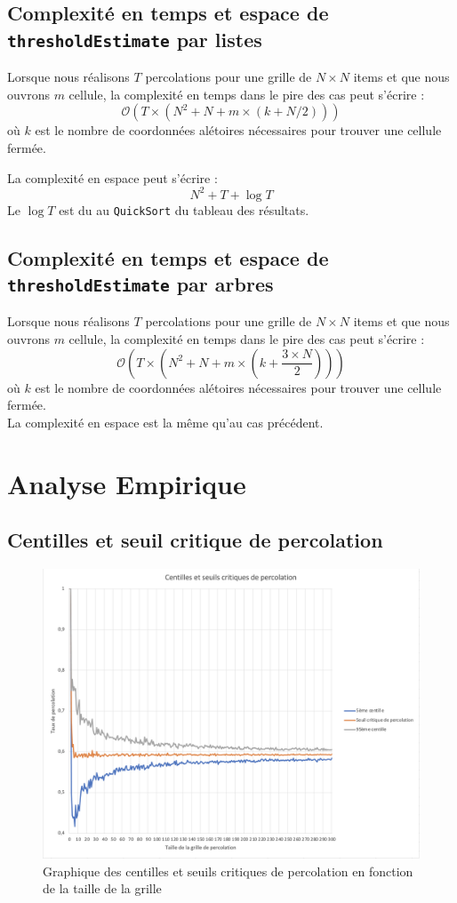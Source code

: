 \documentclass[12pt]{article}
\begin{document}
\subsection{Complexité en temps et espace de \texttt{thresholdEstimate} par listes}
Lorsque nous réalisons $T$ percolations pour une grille de $N \times N$ items et que nous ouvrons $m$ cellule, la complexité en temps dans le pire des cas peut s'écrire : \[\mathcal{O}(T\times(N^2 + N + m \times (k+N/2)))\] 
où $k$ est le nombre de coordonnées alétoires nécessaires pour trouver une cellule fermée.

La complexité en espace peut s'écrire : \[ N^2 + T + \log{T}\]
Le $\log{T}$ est du au \texttt{QuickSort} du tableau des résultats.

\subsection{Complexité en temps et espace de \texttt{thresholdEstimate} par arbres}

Lorsque nous réalisons $T$ percolations pour une grille de $N \times N$ items et que nous ouvrons $m$ cellule, 
la complexité en temps dans le pire des cas peut s'écrire : \[\mathcal{O}(T \times (N^2 + N + m \times (k+\frac{3 \times N}{2})))\] où $k$ 
est le nombre de coordonnées alétoires nécessaires pour trouver une cellule fermée.
\\La complexité en espace est la même qu'au cas précédent.

\newpage
\section{Analyse Empirique}

\subsection{Centilles et seuil critique de percolation}

\begin{figure}[!h]
    \centering
	\captionsetup{justification = centering}
    \includegraphics[scale = 0.3]{Centilles.png}
    \caption{Graphique des centilles et seuils critiques de percolation en fonction de la taille de la grille}
    \label{fig:centilles_taux}
\end{figure}
\end{document}
